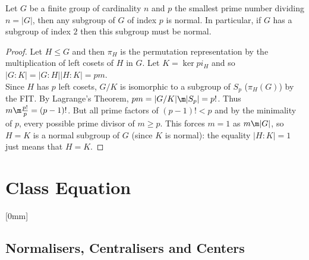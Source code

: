 \begin{ncor}
   Let $G$ be a finite group of cardinality $n$ and $p$ the smallest prime number dividing $n = |G|$, then any subgroup of $G$ of index $p$ is normal. In particular, if $G$ has a subgroup of index $2$ then this subgroup must be normal.
\end{ncor}
\begin{proof}
  Let $H \le G$ and then $\pi_H$ is the permutation representation by the multiplication of left cosets of $H$ in $G$. Let $K = \ker pi_H$ and so $|G : K| = |G : H||H : K| = pm$.\\

  \noindent
  Since $H$ has $p$ left cosets, $G/K$ is isomorphic to a subgroup of $S_p$ ($\pi_H(G)$) by the FIT. By Lagrange’s Theorem, $pm = |G/K| \m |S_p| = p!$. Thus $m \m \frac{p! }{p} = (p-1)!$. But all prime factors of $(p-1)! < p$ and by the minimality of $p$, every possible prime divisor of $m \ge p$. This forces $m =1$ as $m \m |G|$, so $H = K$ is a normal subgroup of $G$ (since $K$ is normal): the equality $|H : K| = 1$ just means that $H = K$.
\end{proof}

\section{Class Equation}[0mm]
\subsection{Normalisers, Centralisers and Centers}

